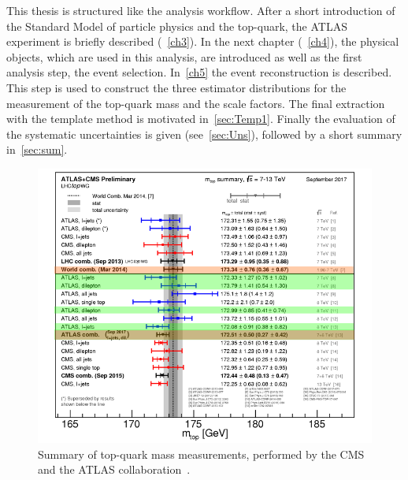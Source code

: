 This thesis is structured like the analysis workflow. After a short introduction of the Standard Model of particle physics and the top-quark, the ATLAS experiment is briefly described (~\cref{ch3}). In the next chapter (~\cref{ch4}), the physical objects, which are used in this analysis, are introduced as well as the first analysis step, the event selection. In~\cref{ch5} the event reconstruction is described. This step is used to construct the three estimator distributions for the measurement of the top-quark mass and the scale factors. The final extraction with the template method is motivated in~\cref{sec:Temp1}. Finally the evaluation of the systematic uncertainties is given (see~\cref{sec:Uns}), followed by a short summary in~\cref{sec:sum}.




\begin{figure}[h]
	\centering
	\includegraphics[width=0.75\linewidth]{Pics/mass}
	\caption{Summary of top-quark mass measurements, performed by the CMS and the ATLAS collaboration~\cite{PubR}. }
	
	\label{fig:mass}
\end{figure}



